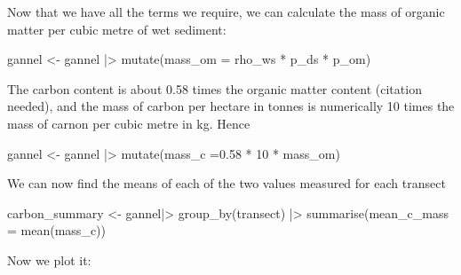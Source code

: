 \documentclass[
  letterpaper,
  DIV=11,
  numbers=noendperiod]{scrreprt}
\newenvironment{Shaded}{\begin{snugshade}}{\end{snugshade}}
\newcommand{\AttributeTok}[1]{\textcolor[rgb]{0.40,0.45,0.13}{#1}}
\newcommand{\DecValTok}[1]{\textcolor[rgb]{0.68,0.00,0.00}{#1}}
\newcommand{\FloatTok}[1]{\textcolor[rgb]{0.68,0.00,0.00}{#1}}
\newcommand{\FunctionTok}[1]{\textcolor[rgb]{0.28,0.35,0.67}{#1}}
\newcommand{\NormalTok}[1]{\textcolor[rgb]{0.00,0.23,0.31}{#1}}
\newcommand{\OtherTok}[1]{\textcolor[rgb]{0.00,0.23,0.31}{#1}}
\newcommand{\SpecialCharTok}[1]{\textcolor[rgb]{0.37,0.37,0.37}{#1}}
\begin{document}
Now that we have all the terms we require, we can calculate the mass of
organic matter per cubic metre of wet sediment:

\begin{Shaded}
\begin{Highlighting}[]
\NormalTok{gannel }\OtherTok{\textless{}{-}}\NormalTok{ gannel }\SpecialCharTok{|\textgreater{}}
  \FunctionTok{mutate}\NormalTok{(}\AttributeTok{mass\_om =}\NormalTok{ rho\_ws }\SpecialCharTok{*}\NormalTok{ p\_ds }\SpecialCharTok{*}\NormalTok{ p\_om)}
\end{Highlighting}
\end{Shaded}

The carbon content is about 0.58 times the organic matter content
(citation needed), and the mass of carbon per hectare in tonnes is
numerically 10 times the mass of carnon per cubic metre in kg. Hence

\begin{Shaded}
\begin{Highlighting}[]
\NormalTok{gannel }\OtherTok{\textless{}{-}}\NormalTok{ gannel }\SpecialCharTok{|\textgreater{}}
  \FunctionTok{mutate}\NormalTok{(}\AttributeTok{mass\_c =}\FloatTok{0.58} \SpecialCharTok{*} \DecValTok{10} \SpecialCharTok{*}\NormalTok{ mass\_om)}
\end{Highlighting}
\end{Shaded}

We can now find the means of each of the two values measured for each
transect

\begin{Shaded}
\begin{Highlighting}[]
\NormalTok{carbon\_summary }\OtherTok{\textless{}{-}}\NormalTok{ gannel}\SpecialCharTok{|\textgreater{}}
  \FunctionTok{group\_by}\NormalTok{(transect) }\SpecialCharTok{|\textgreater{}}
  \FunctionTok{summarise}\NormalTok{(}\AttributeTok{mean\_c\_mass =} \FunctionTok{mean}\NormalTok{(mass\_c))}
\end{Highlighting}
\end{Shaded}

Now we plot it:
\end{document}
